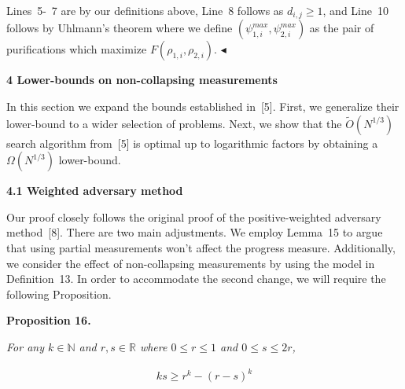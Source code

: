 \documentclass[10pt,a4paper]{article}
\begin{document}
Lines 5- 7 are by our definitions above, Line 8 follows as $d_{i,j}\geq 1$, and Line 10 follows by Uhlmann’s theorem where we define $(\psi^{max}_{1,i},\psi^{max}_{2,i})$ as the pair of purifications which maximize $F(\rho_{1,i},\rho_{2,i})$.
$\blacktriangleleft$\par






\par\medskip\noindent\textbf{
4 Lower-bounds on non-collapsing measurements}\par




In this section we expand the bounds established in [5]. First, we generalize their lower-bound to a wider selection of problems. Next, we show that the $\tilde{O}(N^{1/3})$ search algorithm from [5] is optimal up to logarithmic factors by obtaining a $\Omega(N^{1/3})$ lower-bound.\par




\par\medskip\noindent\textbf{
4.1 Weighted adversary method}\par




Our proof closely follows the original proof of the positive-weighted adversary method [8]. There are two main adjustments. We employ Lemma 15 to argue that using partial measurements won’t affect the progress measure. Additionally, we consider the effect of non-collapsing measurements by using the model in Definition 13. In order to accommodate the second change, we will require the following Proposition.\par





\par\medskip\noindent\textbf{
\textbf{Proposition 16}\textbf{.}
}\par



\emph{For any $k\in\mathbb{N}$ and $r,s\in\mathbb{R}$ where $0\leq r\leq 1$ and $0\leq s\leq 2r$,}\par


\[\begin{gathered}
\displaystyle ks\geq r^{k}-(r-s)^{k}
\end{gathered}\]



\end{document}
